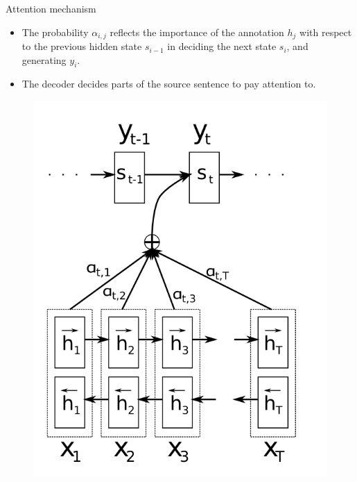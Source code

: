 \documentclass[10pt]{beamer}
\begin{document}
\begin{frame}{Attention mechanism}

\begin{itemize}
\item
The probability $\alpha_{i,j}$ reflects the importance of the annotation $h_j$ with respect to the previous hidden state $s_{i-1}$ in deciding the next state $s_i$, and generating $y_i$.
\item
The decoder decides parts of the source sentence to pay attention to.
\end{itemize}

\begin{figure}[H]
\centering
\includegraphics[scale=0.2]{img/attn.png}
\end{figure}

\end{frame}
\end{document}
